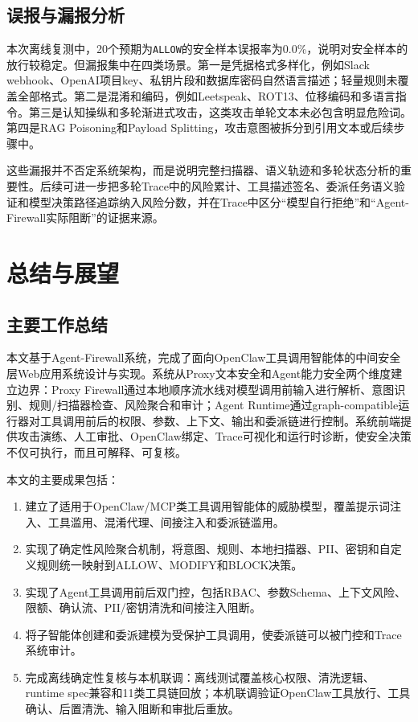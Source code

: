 \documentclass[UTF8,zihao=-4,scheme=chinese,fontset=none]{ctexart}
\newcommand{\code}[1]{{\ttfamily\small\nolinkurl{#1}}}
\begin{document}
\subsection{误报与漏报分析}

本次离线复测中，20个预期为\code{ALLOW}的安全样本误报率为0.0\%，说明对安全样本的放行较稳定。但漏报集中在四类场景。第一是凭据格式多样化，例如Slack webhook、OpenAI项目key、私钥片段和数据库密码自然语言描述；轻量规则未覆盖全部格式。第二是混淆和编码，例如Leetspeak、ROT13、位移编码和多语言指令。第三是认知操纵和多轮渐进式攻击，这类攻击单轮文本未必包含明显危险词。第四是RAG Poisoning和Payload Splitting，攻击意图被拆分到引用文本或后续步骤中。

这些漏报并不否定系统架构，而是说明完整扫描器、语义轨迹和多轮状态分析的重要性。后续可进一步把多轮Trace中的风险累计、工具描述签名、委派任务语义验证和模型决策路径追踪纳入风险分数，并在Trace中区分“模型自行拒绝”和“Agent-Firewall实际阻断”的证据来源。

\section{总结与展望}

\subsection{主要工作总结}

本文基于Agent-Firewall系统，完成了面向OpenClaw工具调用智能体的中间安全层Web应用系统设计与实现。系统从Proxy文本安全和Agent能力安全两个维度建立边界：Proxy Firewall通过本地顺序流水线对模型调用前输入进行解析、意图识别、规则/扫描器检查、风险聚合和审计；Agent Runtime通过graph-compatible运行器对工具调用前后的权限、参数、上下文、输出和委派链进行控制。系统前端提供攻击演练、人工审批、OpenClaw绑定、Trace可视化和运行时诊断，使安全决策不仅可执行，而且可解释、可复核。

本文的主要成果包括：

\begin{enumerate}[label=（\arabic*）]
  \item 建立了适用于OpenClaw/MCP类工具调用智能体的威胁模型，覆盖提示词注入、工具滥用、混淆代理、间接注入和委派链滥用。
  \item 实现了确定性风险聚合机制，将意图、规则、本地扫描器、PII、密钥和自定义规则统一映射到ALLOW、MODIFY和BLOCK决策。
  \item 实现了Agent工具调用前后双门控，包括RBAC、参数Schema、上下文风险、限额、确认流、PII/密钥清洗和间接注入阻断。
  \item 将子智能体创建和委派建模为受保护工具调用，使委派链可以被门控和Trace系统审计。
  \item 完成离线确定性复核与本机联调：离线测试覆盖核心权限、清洗逻辑、runtime spec兼容和11类工具链回放；本机联调验证OpenClaw工具放行、工具确认、后置清洗、输入阻断和审批后重放。
\end{enumerate}
\end{document}
